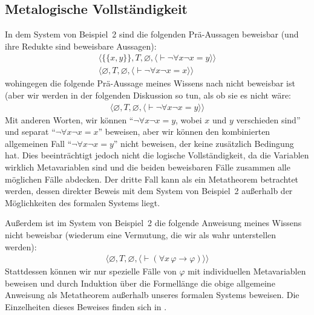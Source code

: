 \subsection{Metalogische Vollständigkeit}

In dem System von Beispiel~2 sind die folgenden Prä-Aussagen beweisbar (und ihre Redukte sind beweisbare Aussagen):
\begin{eqnarray*}
      & \langle\{\{x,y\}\},T,\varnothing,
               \langle \vdash\lnot\forall x\lnot x=y
               \rangle\rangle & \\
     &  \langle\varnothing,T,\varnothing,
               \langle \vdash\lnot\forall x\lnot x=x
               \rangle\rangle &
\end{eqnarray*}
wohingegen die folgende Prä-Aussage meines Wissens nach nicht beweisbar ist (aber wir werden in der folgenden Diskussion so tun, als ob sie es nicht wäre:
\begin{eqnarray*}
     &  \langle\varnothing,T,\varnothing,
               \langle \vdash\lnot\forall x\lnot x=y
               \rangle\rangle &
\end{eqnarray*}
Mit anderen Worten, wir können "`$\lnot\forall x\lnot x=y$, wobei $x$ und $y$ verschieden sind"' und separat "`$\lnot\forall x\lnot x=x$"' beweisen, aber wir können den kombinierten allgemeinen Fall "`$\lnot\forall x\lnot x=y$"' nicht beweisen, der keine zusätzlich Bedingung hat.  Dies beeinträchtigt jedoch nicht die logische Vollständigkeit, da die Variablen wirklich Metavariablen sind und die beiden beweisbaren Fälle zusammen alle möglichen Fälle abdecken.  Der dritte Fall kann als ein Metatheorem betrachtet werden, dessen direkter Beweis mit dem System von Beispiel~2 außerhalb der Möglichkeiten des formalen Systems liegt.

Außerdem ist im System von Beispiel~2 die folgende Anweisung meines Wissens nicht beweisbar (wiederum eine Vermutung, die wir als wahr unterstellen werden):
\begin{eqnarray*}
     & \langle\varnothing,T,\varnothing,
               \langle \vdash(\forall x\, \varphi\to\varphi)
               \rangle\rangle &
\end{eqnarray*}
Stattdessen können wir nur spezielle Fälle von $\varphi$ mit individuellen Metavariablen beweisen und durch Induktion über die Formellänge die obige allgemeine Anweisung als Metatheorem außerhalb unseres formalen Systems beweisen.  Die Einzelheiten dieses Beweises finden sich in \cite{Kalish}.

